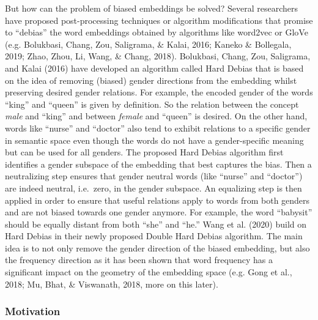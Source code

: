 \documentclass[
  english,
  man,floatsintext]{apa6}
\begin{document}
But how can the problem of biased embeddings be solved? Several researchers have proposed post-processing techniques or algorithm modifications that promise to ``debias'' the word embeddings obtained by algorithms like word2vec or GloVe (e.g. Bolukbasi, Chang, Zou, Saligrama, \& Kalai, 2016; Kaneko \& Bollegala, 2019; Zhao, Zhou, Li, Wang, \& Chang, 2018).
Bolukbasi, Chang, Zou, Saligrama, and Kalai (2016) have developed an algorithm called Hard Debias that is based on the idea of removing (biased) gender directions from the embedding whilst preserving desired gender relations. For example, the encoded gender of the words ``king'' and ``queen'' is given by definition. So the relation between the concept \emph{male} and ``king'' and between \emph{female} and ``queen'' is desired. On the other hand, words like ``nurse'' and ``doctor'' also tend to exhibit relations to a specific gender in semantic space even though the words do not have a gender-specific meaning but can be used for all genders. The proposed Hard Debias algorithm first identifies a gender subspace of the embedding that best captures the bias. Then a neutralizing step ensures that gender neutral words (like ``nurse'' and ``doctor'') are indeed neutral, i.e.~zero, in the gender subspace. An equalizing step is then applied in order to ensure that useful relations apply to words from both genders and are not biased towards one gender anymore. For example, the word ``babysit'' should be equally distant from both ``she'' and ``he.''
Wang et al. (2020) build on Hard Debias in their newly proposed Double Hard Debias algorithm. The main idea is to not only remove the gender direction of the biased embedding, but also the frequency direction as it has been shown that word frequency has a significant impact on the geometry of the embedding space (e.g. Gong et al., 2018; Mu, Bhat, \& Viswanath, 2018, more on this later).

\hypertarget{motivation}{%
\subsubsection{Motivation}\label{motivation}}
\end{document}
